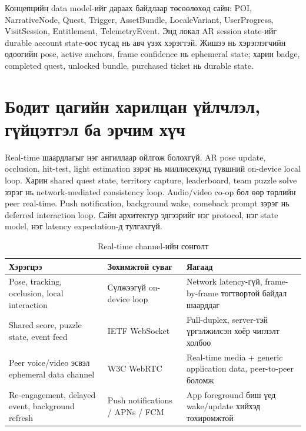\begin{sloppy}
Концепцийн data model-ийг дараах байдлаар төсөөлөхөд сайн: POI, NarrativeNode, Quest, Trigger, AssetBundle, LocaleVariant, UserProgress, VisitSession, Entitlement, TelemetryEvent. Энд локал AR session state-ийг durable account state-оос тусад нь авч үзэх хэрэгтэй. Жишээ нь хэрэглэгчийн одоогийн pose, active anchors, frame confidence нь ephemeral state; харин badge, completed quest, unlocked bundle, purchased ticket нь durable state.

\section*{Бодит цагийн харилцан үйлчлэл, гүйцэтгэл ба эрчим хүч}

Real-time шаардлагыг нэг ангиллаар ойлгож болохгүй. AR pose update, occlusion, hit-test, light estimation зэрэг нь миллисекунд түвшний on-device local loop. Харин shared quest state, territory capture, leaderboard, team puzzle solve зэрэг нь network-mediated consistency loop. Audio/video co-op бол өөр төрлийн peer real-time. Push notification, background wake, comeback prompt зэрэг нь deferred interaction loop. Сайн архитектур эдгээрийг нэг protocol, нэг state model, нэг latency expectation-д тулгахгүй.

\begin{table}[H]
\centering
\caption{Real-time channel-ийн сонголт}
\label{tab:realtime-channels}
\small
\begin{tabular}{|p{4cm}|p{3.5cm}|p{5cm}|}
\hline
\textbf{Хэрэгцээ} & \textbf{Зохимжтой суваг} & \textbf{Яагаад} \\ \hline
Pose, tracking, occlusion, local interaction & Сүлжээгүй on-device loop & Network latency-гүй, frame-by-frame тогтвортой байдал шаарддаг \\ \hline
Shared score, puzzle state, event feed & IETF WebSocket & Full-duplex, server-тэй үргэлжилсэн хоёр чиглэлт холбоо \\ \hline
Peer voice/video эсвэл ephemeral data channel & W3C WebRTC & Real-time media + generic application data, peer-to-peer боломж \\ \hline
Re-engagement, delayed event, background refresh & Push notifications / APNs / FCM & App foreground биш үед wake/update хийхэд тохиромжтой \\ \hline
\end{tabular}
\end{table}


\end{sloppy}
